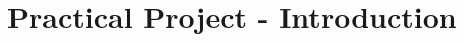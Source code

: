 \documentclass[10pt,twocolumn,letterpaper]{article}
\begin{document}
% 


\newpage

\section{Practical Project - Introduction}

\end{document}
